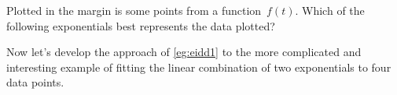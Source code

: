 \begin{activity}
Plotted in the margin is some points from a function~\(f(t)\).  
Which of the following exponentials best represents the data plotted?
\end{activity}


Now let's develop the approach of \autoref{eg:eidd1} to the more complicated and interesting example of fitting the linear combination of two exponentials to four data points.


